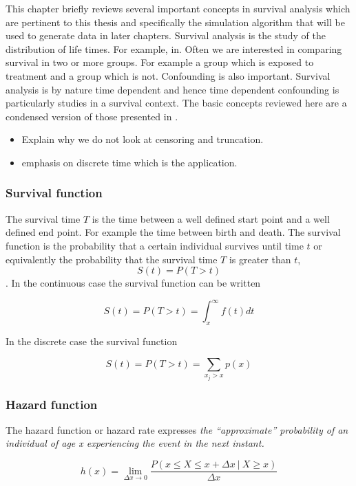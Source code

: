 \documentclass[11pt]{article}
\providecommand{\tightlist}{%
      \setlength{\itemsep}{0pt}\setlength{\parskip}{0pt}}
\begin{document}
This chapter briefly reviews several important concepts in survival
analysis which are pertinent to this thesis and specifically the
simulation algorithm that will be used to generate data in later
chapters. Survival analysis is the study of the distribution of life
times. For example, in. Often we are interested in comparing survival in
two or more groups. For example a group which is exposed to treatment
and a group which is not. Confounding is also important. Survival
analysis is by nature time dependent and hence time dependent
confounding is particularly studies in a survival context. The basic
concepts reviewed here are a condensed version of those presented in
\citet{JohnP.Klein2003}.

\begin{itemize}
\tightlist
\item
  Explain why we do not look at censoring and truncation.
\item
  emphasis on discrete time which is the application.
\end{itemize}

\subsubsection{Survival function}\label{survival-function}

The survival time \(T\) is the time between a well defined start point
and a well defined end point. For example the time between birth and
death. The survival function is the probability that a certain
individual survives until time \(t\) or equivalently the probability
that the survival time \(T\) is greater than \(t\), \[S(t) = P(T > t)\].
In the continuous case the survival function can be written

\[S(t) = P(T > t) = \int_{x}^{\infty}f(t)dt\]

In the discrete case the survival function

\[S(t) = P(T > t) = \sum_{x_j > x}p(x)\]

\subsubsection{Hazard function}\label{hazard-function}

The hazard function or hazard rate expresses \emph{the ``approximate''
probability of an individual of age x experiencing the event in the next
instant.}

\[h(x) = \lim\limits_{\Delta x \to 0}\frac{P(x \le X \le x + \Delta x\ |\ X \ge x)}{\Delta x}\]
\end{document}
